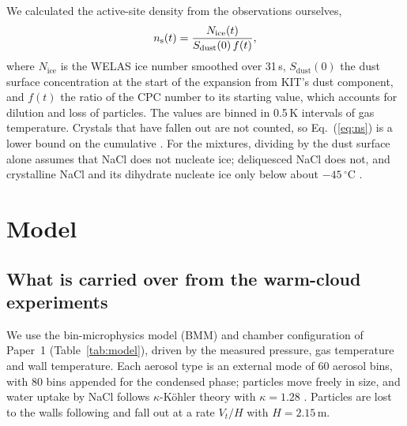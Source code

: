 We calculated the active-site density from the observations ourselves,
\begin{equation}
  n_\mathrm{s}(t) = \frac{N_\mathrm{ice}(t)}{S_\mathrm{dust}(0)\,f(t)},
  \label{eq:ns}
\end{equation}
where $N_\mathrm{ice}$ is the WELAS ice number smoothed over 31\,s, $S_\mathrm{dust}(0)$ the dust surface concentration at the start of the expansion from KIT's dust component, and $f(t)$ the ratio of the CPC number to its starting value, which accounts for dilution and loss of particles. The values are binned in 0.5\,K intervals of gas temperature. Crystals that have fallen out are not counted, so Eq.~(\ref{eq:ns}) is a lower bound on the cumulative \ns. For the mixtures, dividing by the dust surface alone assumes that NaCl does not nucleate ice; deliquesced NaCl does not, and crystalline NaCl and its dihydrate nucleate ice only below about $-45\,^\circ$C \citep{Wagner2013,Wagner2018}.

\section{Model}\label{sec:model}

\subsection{What is carried over from the warm-cloud experiments}

We use the bin-microphysics model (BMM) and chamber configuration of Paper~1 (Table~\ref{tab:model}), driven by the measured pressure, gas temperature and wall temperature. Each aerosol type is an external mode of 60 aerosol bins, with 80 bins appended for the condensed phase; particles move freely in size, and water uptake by NaCl follows $\kappa$-K\"ohler theory with $\kappa = 1.28$ \citep{Petters2007}. Particles are lost to the walls following \citet{LaiNazaroff2000} and fall out at a rate $V_t/H$ with $H = 2.15$\,m.

